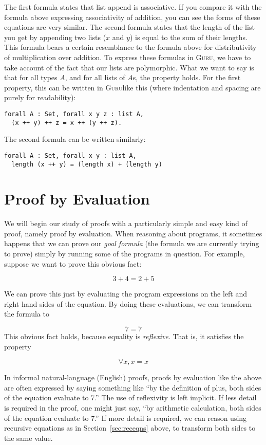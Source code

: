 \documentclass{book}[12pt]
\newcommand{\guru}[0]{\textsc{Guru}}
\begin{document}
\noindent The first formula states that list append is associative.
If you compare it with the formula above expressing associativity of
addition, you can see the forms of these equations are very similar.
The second formula states that the length of the list you get by
appending two lists ($x$ and $y$) is equal to the sum of their
lengths.  This formula bears a certain resemblance to the formula
above for distributivity of multiplication over addition.  To express
these formulas in \guru, we have to take account of the fact that our
lists are polymorphic.  What we want to say is that for all types $A$,
and for all lists of $A$s, the property holds.  For the first
property, this can be written in \guru like this (where indentation and
spacing are purely for readability):

\begin{verbatim}
forall A : Set, forall x y z : list A, 
  (x ++ y) ++ z = x ++ (y ++ z).
\end{verbatim}

\noindent The second formula can be written similarly:

\begin{verbatim}
forall A : Set, forall x y : list A, 
  length (x ++ y) = (length x) + (length y)
\end{verbatim}

\section{Proof by Evaluation}

We will begin our study of proofs with a particularly simple and easy
kind of proof, namely proof by evaluation.  When reasoning about
programs, it sometimes happens that we can prove our \emph{goal
formula} (the formula we are currently trying to prove) simply by
running some of the programs in question.  For example, suppose we
want to prove this obvious fact:

\[ 3+4 = 2+5 
\]

\noindent We can prove this just by evaluating the program expressions
on the left and right hand sides of the equation.  By doing these
evaluations, we can transform the formula to

\[ 7 = 7
\]
\noindent This obvious fact holds, because equality is \emph{reflexive}.
That is, it satisfies the property

\[ \forall x, x = x
\]

\noindent In informal natural-language (English) proofs, proofs by
evaluation like the above are often expressed by saying something like
``by the definition of plus, both sides of the equation evaluate to
7.''  The use of reflexivity is left implicit.  If less detail is
required in the proof, one might just say, ``by arithmetic
calculation, both sides of the equation evaluate to 7.''  If more
detail is required, we can reason using recursive equations as in
Section~\ref{sec:receqns} above, to transform both sides to the same
value.
\end{document}
